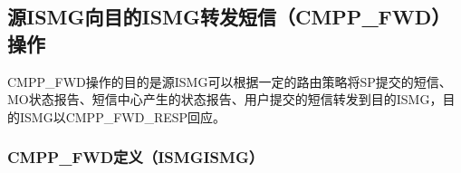 \documentclass[11pt]{book} %
\begin{document}
\subsection{源ISMG向目的ISMG转发短信（CMPP\_FWD）操作}



CMPP\_FWD操作的目的是源ISMG可以根据一定的路由策略将SP提交的短信、MO状态报告、短信中心产生的状态报告、用户提交的短信转发到目的ISMG，目的ISMG以CMPP\_FWD\_RESP回应。

%
%
%
%
%



\subsubsection{CMPP\_FWD定义（ISMG\textrightarrow ISMG）}
\end{document}
